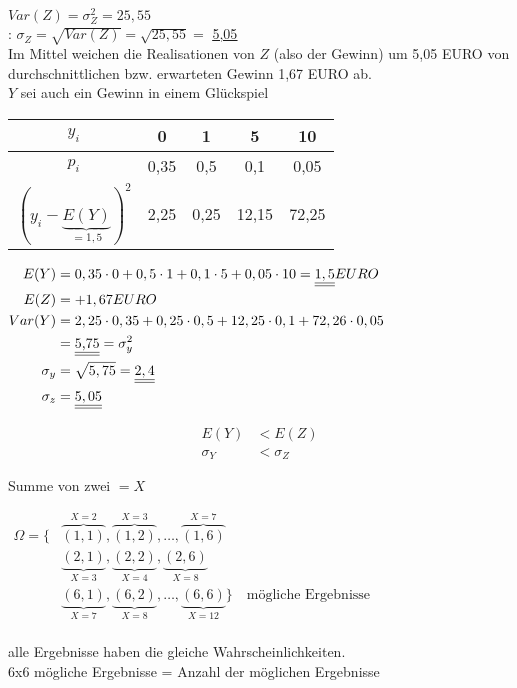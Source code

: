 $Var(Z) = \sigma_Z^2 = 25,55$\\
: $\sigma_Z = \sqrt{Var(Z)} = \sqrt{25,55} = $ \underline{\underline{5,05}} \\

Im Mittel weichen die Realisationen von $Z$ (also der Gewinn) um 5,05 EURO von durchschnittlichen bzw. erwarteten Gewinn 1,67 EURO ab.\\

 $Y$ sei auch ein Gewinn in einem Glückspiel

\begin{tabular}{c | c c c c}
	$y_i$		&		0		&		1		&		5		&		10	\\
	\hline
	$p_i$		&	0,35	& 0,5		&		0,1	&	0,05  \\
	$(y_i -\underbrace{E(Y)}_{= 1,5})^2$
					&	2,25	&	0,25	&	12,15	&	72,25
\end{tabular}

$\begin{aligned}
	E(Y) &= 0,35 \cdot 0 + 0,5 \cdot 1 + 0,1 \cdot 5 + 0,05 \cdot 10 =
	\underline{\underline{1,5}} EURO \\
%
	E(Z) &= +1,67  EURO \\
%
	Var(Y) &= 2,25 \cdot 0,35 + 0,25 \cdot 0,5 + 12,25 \cdot 0,1 +
	72,26 \cdot 0,05 \\
	&= \text{\underline{\underline{5,75}}} = \sigma_y^2\\
%
	\sigma_y &= \sqrt{5,75} = \underline{\underline{2,4}} \\
%
	\sigma_z &= \underline{\underline{5,05}} \\
\end{aligned}$

$$\begin{aligned}
	E(Y)		 &<	E(Z) \\
	\sigma_Y &< \sigma_Z
\end{aligned}$$

Summe von zwei  $ = X$

$\begin{aligned}
\Omega = \Big\{& \overbrace{(1,1)}^{X=2}, \overbrace{(1,2)}^{X=3}, \dots , 
	\overbrace{(1,6)}^{X=7} \\
					 & \underbrace{(2,1)}_{X=3}, \underbrace{(2,2)}_{X=4}, 
	\underbrace{(2,6)}_{X=8} \\
	 				 & \underbrace{(6,1)}_{X=7}, \underbrace{(6,2)}_{X=8}, \dots ,
	\underbrace{(6,6)}_{X=12}\Big\} \quad \text{mögliche Ergebnisse}
\end{aligned}$
~\\
\\
alle Ergebnisse haben die gleiche Wahrscheinlichkeiten. \\
6x6 mögliche Ergebnisse = Anzahl der möglichen Ergebnisse


